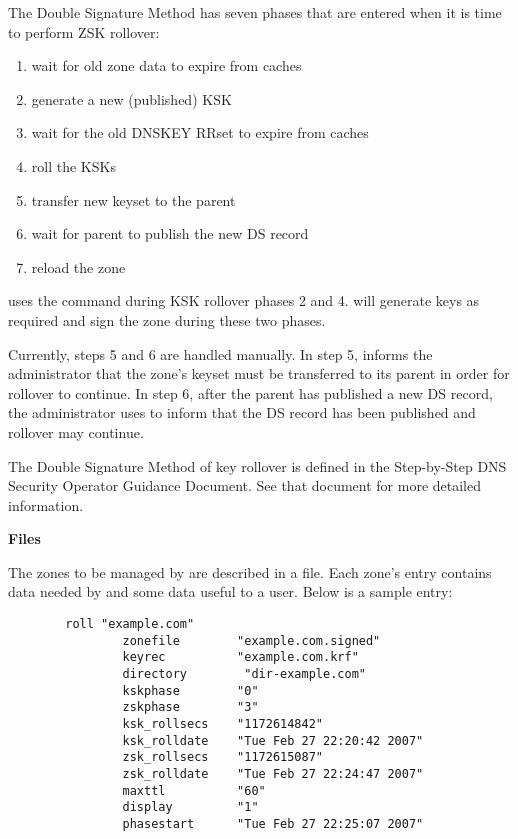 The Double Signature Method has seven phases that are entered when it is time
to perform ZSK rollover:

\begin{enumerate}
\item wait for old zone data to expire from caches
\item generate a new (published) KSK
\item wait for the old DNSKEY RRset to expire from caches
\item roll the KSKs
\item transfer new keyset to the parent
\item wait for parent to publish the new DS record
\item reload the zone
\end{enumerate}

 uses the  command during KSK rollover phases 2
and 4.   will generate keys as required and sign the zone
during these two phases.

Currently, steps 5 and 6 are handled manually.  In step 5, 
informs the administrator that the zone's keyset must be transferred to its
parent in order for rollover to continue.  In step 6, after the parent has
published a new DS record, the administrator uses  to inform
 that the DS record has been published and rollover may continue.

The Double Signature Method of key rollover is defined in the Step-by-Step
DNS Security Operator Guidance Document.  See that document for more detailed
information.

{\bf {} Files}

The zones to be managed by  are described in a 
file.  Each zone's entry contains data needed by  and some data
useful to a user.  Below is a sample  entry:

\begin{verbatim}
        roll "example.com"
                zonefile        "example.com.signed"
                keyrec          "example.com.krf"
                directory        "dir-example.com"
                kskphase        "0"
                zskphase        "3"
                ksk_rollsecs    "1172614842"
                ksk_rolldate    "Tue Feb 27 22:20:42 2007"
                zsk_rollsecs    "1172615087"
                zsk_rolldate    "Tue Feb 27 22:24:47 2007"
                maxttl          "60"
                display         "1"
                phasestart      "Tue Feb 27 22:25:07 2007"
\end{verbatim}


